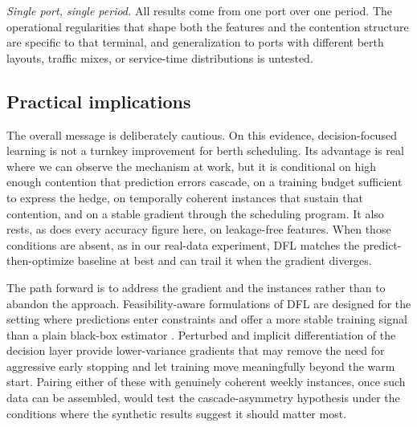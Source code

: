 \emph{Single port, single period.} All results come from one port over one
period. The operational regularities that shape both the features and the
contention structure are specific to that terminal, and generalization to ports
with different berth layouts, traffic mixes, or service-time distributions is
untested.

\subsection{Practical implications}\label{sec:disc-practice}

The overall message is deliberately cautious. On this evidence, decision-focused
learning is not a turnkey improvement for berth scheduling. Its advantage is
real where we can observe the mechanism at work, but it is conditional on high
enough contention that prediction errors cascade, on a training budget sufficient
to express the hedge, on temporally coherent instances that sustain that
contention, and on a stable gradient through the scheduling program. It also
rests, as does every accuracy figure here, on leakage-free features. When those
conditions are absent, as in our real-data experiment, DFL matches the
predict-then-optimize baseline at best and can trail it when the gradient
diverges.

The path forward is to address the gradient and the instances rather than to
abandon the approach. Feasibility-aware formulations of DFL are designed for the
setting where predictions enter constraints and offer a more stable training
signal than a plain black-box estimator \citep{mandi2025feasibility}. Perturbed
and implicit differentiation of the decision layer
\citep{berthet2020learning, niepert2021imle} provide lower-variance gradients
that may remove the need for aggressive early stopping and let training move
meaningfully beyond the warm start. Pairing either of these with genuinely
coherent weekly instances, once such data can be assembled, would test the
cascade-asymmetry hypothesis under the conditions where the synthetic results
suggest it should matter most.
